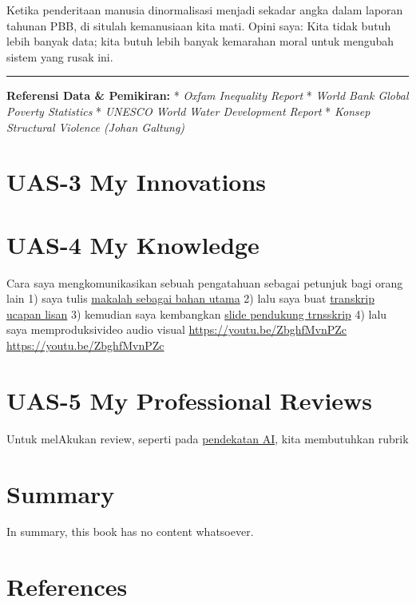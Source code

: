 \documentclass[
  letterpaper,
  DIV=11,
  numbers=noendperiod]{scrreprt}
\begin{document}
Ketika penderitaan manusia dinormalisasi menjadi sekadar angka dalam
laporan tahunan PBB, di situlah kemanusiaan kita mati. Opini saya: Kita
tidak butuh lebih banyak data; kita butuh lebih banyak kemarahan moral
untuk mengubah sistem yang rusak ini.

\begin{center}\rule{0.5\linewidth}{0.5pt}\end{center}

\textbf{Referensi Data \& Pemikiran:} * \emph{Oxfam Inequality Report} *
\emph{World Bank Global Poverty Statistics} * \emph{UNESCO World Water
Development Report} * \emph{Konsep Structural Violence (Johan Galtung)}


\chapter{UAS-3 My Innovations}\label{uas-3-my-innovations}


\chapter{UAS-4 My Knowledge}\label{uas-4-my-knowledge}

Cara saya mengkomunikasikan sebuah pengatahuan sebagai petunjuk bagi
orang lain 1) saya tulis
\href{Rekomendasi\%20Presentasi\%20Efektif(Contoh\%20Makalah).pdf}{makalah
sebagai bahan utama} 2) lalu saya buat
\href{Contoh\%20Transkrip\%20Presentasi.pdf}{transkrip ucapan lisan} 3)
kemudian saya kembangkan
\href{Rekomendasi\%20Presentasi\%20(Contoh\%20Slides).pdf}{slide
pendukung trnsskrip} 4) lalu saya memproduksivideo audio visual
\url{https://youtu.be/ZbghfMvnPZc} \url{https://youtu.be/ZbghfMvnPZc}


\chapter{UAS-5 My Professional
Reviews}\label{uas-5-my-professional-reviews}

Untuk melAkukan review, seperti pada
\href{../My_Personal_Reviews/Doc.5.Mengevaluasi-Esai-Berdasarkan-Rubrik.pdf}{pendekatan
AI}, kita membutuhkan rubrik


\chapter{Summary}\label{summary}

In summary, this book has no content whatsoever.


\chapter*{References}\label{references}


\label{refs}
\end{document}

